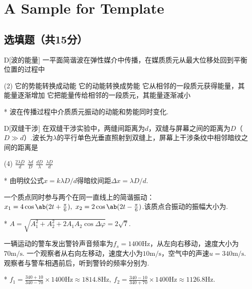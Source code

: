 \chapter{A Sample for  Template}
\fancyhead[R]{\color{H6}\kaishu\rightmark\,}

\section{选填题（共15分）}
\begin{choice}{D}[波的能量]
    一平面简谐波在弹性媒介中传播，在媒质质元从最大位移处回到平衡位置的过程中
    \begin{tasks}(2)
        \task 它的势能转换成动能
        \task 它的动能转换成势能
        \task 它从相邻的一段质元获得能量，其能量逐渐增加
        \task 它把能量传给相邻的一段质元，其能量逐渐减小
    \end{tasks}
\end{choice}
\begin{solution}*
    波在传播过程中介质质元振动的动能和势能同时变化.
\end{solution}

\begin{choice}{D}[双缝干涉]
    在双缝干涉实验中，两缝间距离为$d$，双缝与屏幕之间的距离为$D$（$D\gg d$）.波长为$\lambda$的平行单色光垂直照射到双缝上，屏幕上干涉条纹中相邻暗纹之间的距离是
    \begin{tasks}(4)
        \task $\frac{2\lambda D}{d}$
        \task $\frac{\lambda d}{D}$
        \task $\frac{dD}{\lambda}$
        \task $\frac{\lambda D}{d}$
    \end{tasks}
\end{choice}
\begin{solution}*
    由明纹公式$x=k\lambda D/d$得暗纹间距$\Delta x=\lambda D/d$.
\end{solution}

\begin{problem}[简谐振动的合成][3]
    一个质点同时参与两个在同一直线上的简谐振动：$x_1=4\cos{\ab(2t+\frac{\pi}{6})},\ x_2=2\cos{\ab(2t-\frac{\pi}{6})}$.该质点合振动的振幅大小为.
\end{problem}
\begin{solution}*
    $A=\sqrt{A_1^2+A_2^2+2A_1A_2\cos{\Delta\varphi}}=2\sqrt{7}$.
\end{solution}

\begin{problem}[多普勒效应][6]
    一辆运动的警车发出警铃声音频率为$f_s=1400\mathrm{Hz}$，从左向右移动，速度大小为$70\mathrm{m/s}$. 一个观察者从右向左移动，速度大小为$10\mathrm{m/s}$，空气中的声速$u=340\mathrm{m/s}$.观察者与警车相遇前后，听到警铃的频率分别为.
\end{problem}
\begin{solution}*
    $f_1=\frac{340+10}{340-70}\times 1400\mathrm{Hz}\approx 1814.8\mathrm{Hz},\ f_2=\frac{340-10}{340+70}\times 1400\mathrm{Hz}\approx 1126.8\mathrm{Hz}$.
\end{solution}

